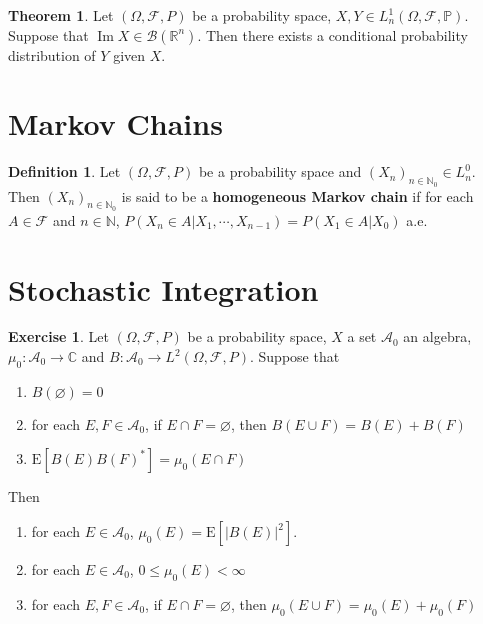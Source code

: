 \documentclass[12pt]{amsart}
\theoremstyle{definition}
\newtheorem{defn}[definition]{Definition}
\newtheorem{thm}[definition]{Theorem}
\newtheorem{ex}[definition]{Exercise}
\newcommand{\Om}{\Omega}
\newcommand{\C}{\mathbb{C}}
\newcommand{\N}{\mathbb{N}}
\newcommand{\R}{\mathbb{R}}
\renewcommand{\P}{\mathbb{P}}
\newcommand{\MA}{\mathcal{A}}
\newcommand{\MB}{\mathcal{B}}
\newcommand{\MF}{\mathcal{F}}
\newcommand{\E}{\text{E}}
\DeclareMathOperator{\Img}{Im}
\begin{document}
	\begin{thm}
	Let $(\Om, \MF, P)$ be a probability space, $X,Y \in L_n^1(\Om, \MF, \P)$. Suppose that $\Img X \in \MB(\R^n)$. Then there exists a conditional probability distribution of $Y$ given $X$. 
	\end{thm}
	
	
	
	
	
	
	
	
	
	
	
	
	
	
	\newpage
	\section{Markov Chains}	

	
	\begin{defn}
	Let $(\Om, \MF, P)$ be a probability space and $(X_n)_{n \in \N_0} \in L_n^0$. Then $(X_n)_{n \in \N_0}$ is said to be a \textbf{homogeneous Markov chain} if for each $A \in \MF$ and $n \in \N$, $P(X_n \in A| X_1, \cdots, X_{n-1}) = P(X_1 \in A| X_{0})$ a.e. 
	\end{defn}
	
	
	
	
	
	
	
	
	
	
	
	
	\newpage
	\section{Stochastic Integration}
	\begin{ex}
	Let $(\Om, \MF, P)$ be a probability space, $X$ a set $\MA_0$ an algebra, $\mu_0:\MA_0 \rightarrow \C$ and $B:\MA_0 \rightarrow L^2(\Om, \MF, P)$. 
	Suppose that 
	\begin{enumerate}
	\item $B(\varnothing) = 0$
	\item for each $E, F \in \MA_0$, if $E \cap F = \varnothing$, then $B(E \cup F) = B(E) + B(F)$
	\item $\E [B(E)B(F)^*] = \mu_0(E \cap F)$
	\end{enumerate}
	Then 
	\begin{enumerate}
	\item for each $E \in \MA_0$, $\mu_0(E) = \E[|B(E)|^2]$.
	\item for each $E \in \MA_0$, $0 \leq \mu_0(E) < \infty$ 
	\item for each $E, F \in \MA_0$, if $E \cap F = \varnothing$, then $\mu_0(E \cup F) = \mu_0(E) + \mu_0(F)$
	\end{enumerate}
	\end{ex}
	
\end{document}
